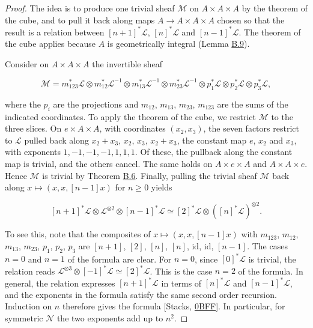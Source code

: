 \documentclass[11pt]{article}
\begin{document}
\begin{proof}[{Proof}]\label{bp32}%
The idea is to produce one trivial sheaf \(\mathcal M\) on \(A\times A\times A\) by the theorem of the cube, and to pull it back along maps \(A\to A\times A\times A\) chosen so that the result is a relation between \([n+1]^*\mathcal L\), \([n]^*\mathcal L\) and \([n-1]^*\mathcal L\). The theorem of the cube applies because \(A\) is geometrically integral (Lemma \hyperref[bp26]{B.9}).

Consider on \(A\times A\times A\) the invertible sheaf

\[
\mathcal M=m_{123}^*\mathcal L\otimes m_{12}^*\mathcal L^{-1}\otimes
m_{13}^*\mathcal L^{-1}\otimes m_{23}^*\mathcal L^{-1}\otimes
p_1^*\mathcal L\otimes p_2^*\mathcal L\otimes p_3^*\mathcal L,
\]

where the \(p_i\) are the projections and \(m_{12}\), \(m_{13}\), \(m_{23}\), \(m_{123}\) are the sums of the indicated coordinates. To apply the theorem of the cube, we restrict \(\mathcal M\) to the three slices. On \(e\times A\times A\), with coordinates \((x_2,x_3)\), the seven factors restrict to \(\mathcal L\) pulled back along \(x_2+x_3\), \(x_2\), \(x_3\), \(x_2+x_3\), the constant map \(e\), \(x_2\) and \(x_3\), with exponents \(1,-1,-1,-1,1,1,1\). Of these, the pullback along the constant map is trivial, and the others cancel. The same holds on \(A\times e\times A\) and \(A\times A\times e\). Hence \(\mathcal M\) is trivial by Theorem \hyperref[bp17]{B.6}. Finally, pulling the trivial sheaf \(\mathcal M\) back along \(x\mapsto(x,x,[n-1]x)\) for \(n\ge0\) yields

\[
[n+1]^*\mathcal L\otimes\mathcal L^{\otimes2}
\otimes[n-1]^*\mathcal L
\simeq [2]^*\mathcal L\otimes([n]^*\mathcal L)^{\otimes2}.
\]

To see this, note that the composites of \(x\mapsto(x,x,[n-1]x)\) with \(m_{123}\), \(m_{12}\), \(m_{13}\), \(m_{23}\), \(p_1\), \(p_2\), \(p_3\) are \([n+1]\), \([2]\), \([n]\), \([n]\), \(\mathrm{id}\), \(\mathrm{id}\), \([n-1]\). The cases \(n=0\) and \(n=1\) of the formula are clear. For \(n=0\), since \([0]^*\mathcal L\) is trivial, the relation reads \(\mathcal L^{\otimes3}\otimes[-1]^*\mathcal L\simeq[2]^*\mathcal L\). This is the case \(n=2\) of the formula. In general, the relation expresses \([n+1]^*\mathcal L\) in terms of \([n]^*\mathcal L\) and \([n-1]^*\mathcal L\), and the exponents in the formula satisfy the same second order recursion. Induction on \(n\) therefore gives the formula [Stacks, \href{https://stacks.math.columbia.edu/tag/0BFF}{0BFF}]. In particular, for symmetric \(\mathcal N\) the two exponents add up to \(n^2\).
\end{proof}
\end{document}
